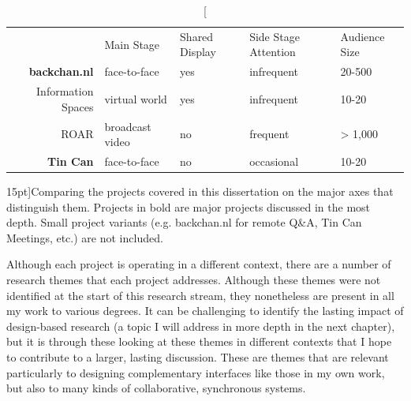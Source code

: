 \begin{table}[tb]

\begin{tabular}{r|llll}
& Main Stage & Shared Display & Side Stage Attention & Audience Size \\
\textbf{backchan.nl} & face-to-face & yes & infrequent & 20-500 \\
Information Spaces & virtual world & yes & infrequent & 10-20 \\
ROAR & broadcast video & no & frequent & > 1,000 \\
\textbf{Tin Can} & face-to-face & no & occasional & 10-20 \\
\end{tabular}
\label{tab:project-axes}
\caption[][15pt]{Comparing the projects covered in this dissertation on the major axes that distinguish them. Projects in bold are major projects discussed in the most depth. Small project variants (e.g. backchan.nl for remote Q\&A, Tin Can Meetings, etc.) are not included.}
\end{table}


Although each project is operating in a different context, there are a number of research themes that each project addresses. Although these themes were not identified at the start of this research stream, they nonetheless are present in all my work to various degrees. It can be challenging to identify the lasting impact of design-based research (a topic I will address in more depth in the next chapter), but it is through these looking at these themes in different contexts that I hope to contribute to a larger, lasting discussion. These are themes that are relevant particularly to designing complementary interfaces like those in my own work, but also to many kinds of collaborative, synchronous systems.


